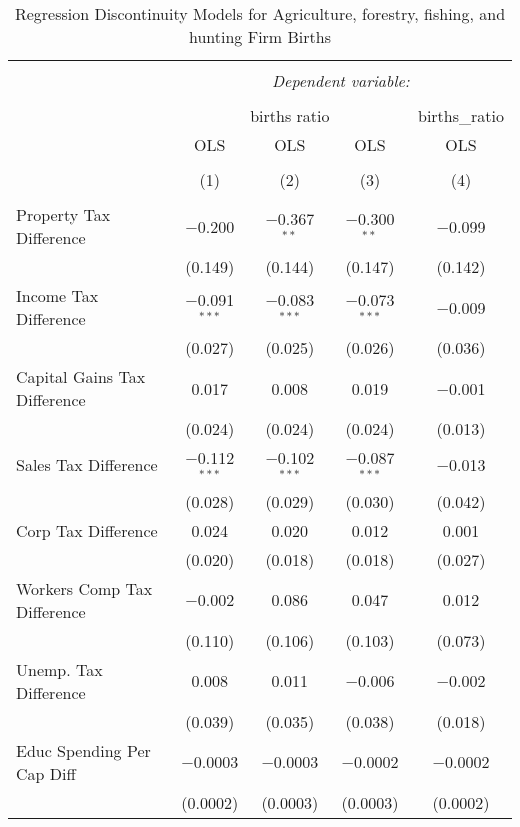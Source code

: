 
\begin{table}[!htbp] \centering 
  \caption{Regression Discontinuity Models for  Agriculture, forestry, fishing, and hunting Firm Births} 
  \label{11rd} 
\begin{tabular}{@{\extracolsep{5pt}}lcccc} 
\\[-1.8ex]\hline 
\hline \\[-1.8ex] 
 & \multicolumn{4}{c}{\textit{Dependent variable:}} \\ 
\cline{2-5} 
\\[-1.8ex] & \multicolumn{3}{c}{births ratio} & births\_ratio \\ 
 & OLS & OLS & OLS & OLS \\ 
\\[-1.8ex] & (1) & (2) & (3) & (4)\\ 
\hline \\[-1.8ex] 
 Property Tax Difference & $-$0.200 & $-$0.367$^{**}$ & $-$0.300$^{**}$ & $-$0.099 \\ 
  & (0.149) & (0.144) & (0.147) & (0.142) \\ 
  Income Tax Difference & $-$0.091$^{***}$ & $-$0.083$^{***}$ & $-$0.073$^{***}$ & $-$0.009 \\ 
  & (0.027) & (0.025) & (0.026) & (0.036) \\ 
  Capital Gains Tax Difference & 0.017 & 0.008 & 0.019 & $-$0.001 \\ 
  & (0.024) & (0.024) & (0.024) & (0.013) \\ 
  Sales Tax Difference & $-$0.112$^{***}$ & $-$0.102$^{***}$ & $-$0.087$^{***}$ & $-$0.013 \\ 
  & (0.028) & (0.029) & (0.030) & (0.042) \\ 
  Corp Tax Difference & 0.024 & 0.020 & 0.012 & 0.001 \\ 
  & (0.020) & (0.018) & (0.018) & (0.027) \\ 
  Workers Comp Tax Difference & $-$0.002 & 0.086 & 0.047 & 0.012 \\ 
  & (0.110) & (0.106) & (0.103) & (0.073) \\ 
  Unemp. Tax Difference & 0.008 & 0.011 & $-$0.006 & $-$0.002 \\ 
  & (0.039) & (0.035) & (0.038) & (0.018) \\ 
  Educ Spending Per Cap Diff & $-$0.0003 & $-$0.0003 & $-$0.0002 & $-$0.0002 \\ 
  & (0.0002) & (0.0003) & (0.0003) & (0.0002) \\ 

\end{tabular}
\end{table}
